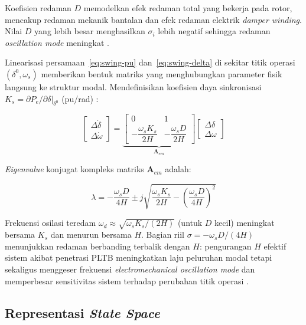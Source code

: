 Koefisien redaman $D$ memodelkan efek redaman total yang bekerja pada rotor, mencakup
redaman mekanik bantalan dan efek redaman elektrik \textit{damper winding}. Nilai $D$
yang lebih besar menghasilkan $\sigma_i$ lebih negatif sehingga redaman
\textit{oscillation mode} meningkat \cite{kundur1994power}.

Linearisasi persamaan~\eqref{eq:swing-pu} dan~\eqref{eq:swing-delta} di sekitar titik
operasi $(\delta^0, \omega_s)$ memberikan bentuk matriks yang menghubungkan parameter
fisik langsung ke struktur modal. Mendefinisikan koefisien daya sinkronisasi
$K_s = \partial P_e/\partial\delta\big|_{\delta^0}$ (pu/rad) \cite{kundur1994power}:

\begin{equation}
  \begin{bmatrix}\Delta\dot{\delta} \\[4pt] \Delta\dot{\omega}\end{bmatrix}
  = \underbrace{\begin{bmatrix}
      0 & 1 \\[6pt]
      -\dfrac{\omega_s K_s}{2H} & -\dfrac{\omega_s D}{2H}
    \end{bmatrix}}_{\mathbf{A}_{em}}
  \begin{bmatrix}\Delta\delta \\[4pt] \Delta\omega\end{bmatrix}
  \label{eq:swing-matrix}
\end{equation}

\textit{Eigenvalue} konjugat kompleks matriks $\mathbf{A}_{em}$ adalah:

\begin{equation}
  \lambda = -\frac{\omega_s D}{4H}
    \pm j\sqrt{\frac{\omega_s K_s}{2H} - \left(\frac{\omega_s D}{4H}\right)^2}
  \label{eq:swing-eigenvalue}
\end{equation}

Frekuensi osilasi teredam $\omega_d \approx \sqrt{\omega_s K_s/(2H)}$ (untuk $D$ kecil)
meningkat bersama $K_s$ dan menurun bersama $H$. Bagian riil $\sigma = -\omega_s D/(4H)$
menunjukkan redaman berbanding terbalik dengan $H$: pengurangan $H$ efektif sistem
akibat penetrasi PLTB meningkatkan laju peluruhan modal tetapi sekaligus menggeser
frekuensi \textit{electromechanical oscillation mode} dan memperbesar sensitivitas
sistem terhadap perubahan titik operasi \cite{kundur1994power}.

\subsection{Representasi \textit{State Space}}

